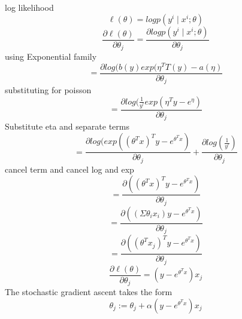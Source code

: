 \begin{answer}
log likelihood \[ \ell(\theta) = log p(y^i\mid x^i;\theta) \]
\[\frac{\partial \ell(\theta)}{\partial \theta_j} = \frac{\partial log p(y^i\mid x^i;\theta)}{\partial \theta_j} \]
using Exponential family
\[= \frac{\partial log(b(y) exp(\eta^T T(y) - a(\eta)}{\partial \theta_j} \]
substituting for poisson
\[= \frac{\partial log(\frac{1}{y^!} exp(\eta^T y - e^\eta)}{\partial \theta_j} \]
Substitute eta and separate terms
\[= \frac{\partial log(exp((\theta^T x)^T y - e^{\theta^T x})}{\partial \theta_j} + \frac{\partial log(\frac{1}{y^!})}{\partial \theta_j} \]
cancel term and cancel log and exp
\[= \frac{\partial ((\theta^T x)^T y - e^{\theta^T x})}{\partial \theta_j} \]
\[= \frac{\partial ((\Sigma \theta_i x_i)y - e^{\theta^T x})}{\partial \theta_j} \]
\[= \frac{\partial ((\theta^T x_j)^T y - e^{\theta^T x})}{\partial \theta_j} \]
\[ \frac{\partial \ell(\theta)}{\partial \theta_j} = (y - e^{\theta^T x})x_j \]
The stochastic gradient ascent takes the form
\[ \theta_j := \theta_j + \alpha(y - e^{\theta^T x})x_j \]
\end{answer}
